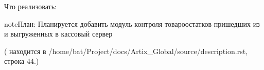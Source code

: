 \documentclass[letterpaper,10pt,russian]{sphinxmanual}
\begin{document}
\sphinxAtStartPar
Что реализовать:

\begin{sphinxadmonition}{note}{План:}
\sphinxAtStartPar
Планируется добавить модуль контроля товаро\sphinxhyphen{}остатков пришедших из  и выгруженных в кассовый сервер
\end{sphinxadmonition}

\sphinxAtStartPar
({\hyperref[\detokenize{description:id2}]{}} находится в /home/bat/Project/docs/Artix\_Global/source/description.rst, строка 44.)



\renewcommand{\indexname}{Алфавитный указатель}
\printindex
\end{document}
